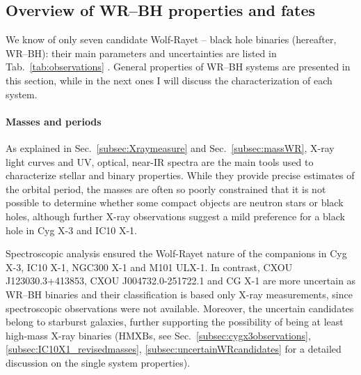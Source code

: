 \documentclass[a4paper,titlepage]{book}     	%
\begin{document}
\subsection{Overview of WR--BH properties and fates}
We know of only seven candidate Wolf-Rayet -- black hole binaries (hereafter, WR--BH): their main parameters and uncertainties are listed in Tab.\ \ref{tab:observations} \cite{observations}. General properties of WR--BH systems are presented in this section, while in the next ones I will discuss the characterization of each system.


\paragraph{Masses and periods} As explained in Sec.\ \ref{subsec:Xraymeasure} and Sec.\ \ref{subsec:massWR}, X-ray light curves and UV, optical, near-IR spectra are the main tools used to characterize stellar and binary properties. While they provide precise estimates of the orbital period, the masses are often so poorly constrained that it is not possible to determine whether some compact objects are neutron stars or black holes, although further X-ray observations suggest a mild preference for a black hole in Cyg X-3 and IC10 X-1. 

Spectroscopic analysis ensured the Wolf-Rayet nature of the companions in Cyg X-3, IC10 X-1, NGC300 X-1 and M101 ULX-1. In contrast, CXOU J123030.3+413853, CXOU J004732.0-251722.1 and CG X-1 are more uncertain as WR--BH binaries and their classification is based only X-ray measurements, since spectroscopic observations were not available.  Moreover, the uncertain candidates belong to starburst galaxies, further supporting the possibility of being at least high-mass X-ray binaries (HMXBs, see Sec.\ \ref{subsec:cygx3observations}, \ref{subsec:IC10X1_revisedmasses}, \ref{subsec:uncertainWRcandidates} for a detailed discussion on the single system properties).
\end{document}
